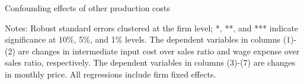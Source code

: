 \documentclass[10pt]{beamer}
\begin{document}
\begin{frame}{Confounding effects of other production costs}
\begin{table}[htbp]
{\begin{threeparttable}
            \begin{tablenotes}
                \footnotesize
                \item Notes: Robust standard errors clustered at the firm level;  *, **, and *** indicate significance at 10\%, 5\%, and 1\% levels. The dependent variables in columns (1)-(2) are changes in intermediate input cost over sales ratio and wage expense over sales ratio, respectively. The dependent variables in columns (3)-(7) are changes in monthly price. All regressions include firm fixed effects.
    	\end{tablenotes}
        \end{threeparttable}
        }
        \label{tab.other}
    \end{table}
\end{frame}
\end{document}
